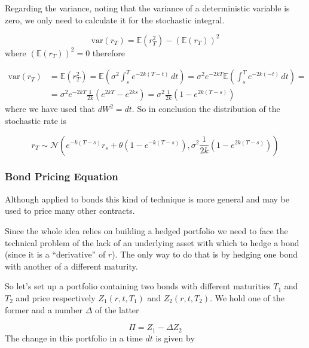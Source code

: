 Regarding the variance, noting that the variance of a deterministic
variable is zero, we only need to calculate it for the
stochastic integral. %

\begin{equation*}
	\textrm{var}(r_T)=\mathbb{E}(r^2_T)-(\mathbb{E}(r_T))^2
\end{equation*}
where \((\mathbb{E}(r_T))^2 = 0\) therefore

\begin{equation}
\begin{aligned}
\textrm{var}(r_T)&=\mathbb{E}(r^2_T)=\mathbb{E}(\sigma^2 \int^T_s e^{-2k(T-t)}\,dt)=\sigma^2 e^{-2kT} \mathbb{E}( \int^T_s e^{-2k(-t)}\,dt)=\\
&=\sigma^2 e^{-2kT} \frac {1}{2k}(e^{2kT}-e^{2ks})=\sigma^2 \frac {1}{2k}(1-e^{2k(T-s)}) 
\end{aligned}
\end{equation}
where we have used that $dW^2 = dt$.
So in conclusion the distribution of the stochastic rate is

\begin{equation}
	r_T \sim \mathcal{N}(e^{-k(T-s)} r_s+\theta(1-e^{-k(T-s)}),\sigma^2 \frac {1}{2k}(1-e^{2k(T-s)}))
\end{equation}

\subsubsection{Bond Pricing Equation}\label{bond-pricing-equation}

Although applied to bonds this kind of technique is more
general and may be used to price many other contracts.

Since the whole idea relies on building a hedged portfolio we need to
face the technical problem of the lack of an underlying asset with which
to hedge a bond (since it is a ``derivative'' of \(r\)). The only way to
do that is by hedging one bond with another of a different maturity.

So let's set up a portfolio containing two bonds with different
maturities \(T_1\) and \(T_2\) and price respectively \(Z_1(r, t, T_1)\)
and \(Z_2(r, t, T_2)\). We hold one of the former and a number
\(\Delta\) of the latter

\begin{equation*}
	\Pi = Z_1 − \Delta Z_2
\end{equation*}
The change in this portfolio in a time \(dt\) is given by

